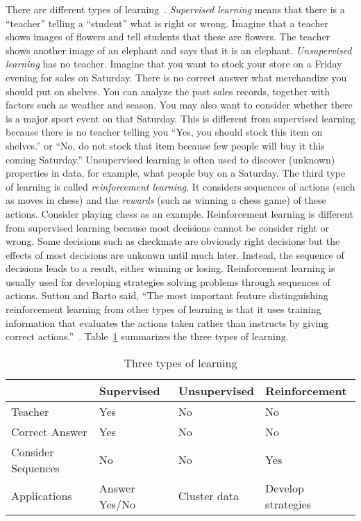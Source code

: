 There are different types of
learning~\cite{Goodfellow2016DeepLearning,
  Sutton2017ReinforcementLearningIntroduction}.  {\it Supervised
  learning} means that there is a ``teacher'' telling a ``student''
what is right or wrong. Imagine that a teacher shows images of flowers
and tell students that these are flowers. The teacher shows another
image of an elephant and says that it is an elephant.  {\it
  Unsupervised learning} has no teacher. Imagine that you want to
stock your store on a Friday evening for sales on Saturday.  There is
no correct answer what merchandize you should put on shelves.  You can
analyze the past sales records, together with factors such as weather
and season.  You may also want to consider whether there is a major
sport event on that Saturday.  This is different from supervised
learning because there is no teacher telling you ``Yes, you should
stock this item on shelves.''  or ``No, do not stock that item because
few people will buy it this coming Saturday.''  Unsupervised learning
is often used to discover (unknown) properties in data, for example,
what people buy on a Saturday.  The third type of learning is called
{\it reinforcement learning}.  It considers sequences of actions (such
as moves in chess) and the {\it rewards} (such as winning a chess
game) of these actions.  Consider playing chess as an example.
Reinforcement learning is different from supervised learning because
most decisions cannot be consider right or wrong. Some decisions such
as checkmate are obviously right decisions but the effects of most
decisions are unkonwn until much later. Instead, the sequence of
decisions leads to a result, either winning or losing. Reinforcement
learning is usually used for developing strategies solving problems
through sequences of actions.  Sutton and Barto said, ``The most
important feature distinguishing reinforcement learning from other
types of learning is that it uses training information that evaluates
the actions taken rather than instructs by giving correct
actions.''~\cite{Sutton2017ReinforcementLearningIntroduction}.
Table~\ref{table:threetypesoflearning} summarizes the three types of
learning.

\vspace{0.1in}
\begin{table}
  \begin{tabular}{p{1.2in}p{1.2in}p{1.2in}p{1.2in}}
    &    {\bf Supervised} & {\bf Unsupervised} & {\bf Reinforcement} \\
    \hline
    Teacher & Yes & No & No \\
    Correct Answer & Yes & No & No \\
    Consider Sequences & No & No & Yes \\
    Applications & Answer Yes/No & Cluster data & Develop strategies \\
  \end{tabular}
  \caption{Three types of learning}
  \label{table:threetypesoflearning}
\end{table}
\vspace{0.1in}

